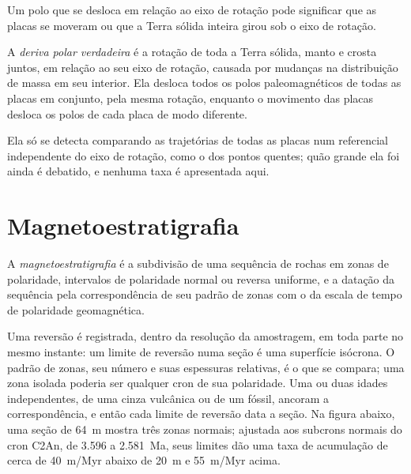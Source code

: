 Um polo que se desloca em relação ao eixo de rotação pode significar que as placas
se moveram ou que a Terra sólida inteira girou sob o eixo de rotação.

\begin{definition}\label{def:b3:palaeomagnetism:tpw}
A \emph{deriva polar verdadeira} é a rotação de toda a
Terra sólida, manto e crosta juntos, em relação ao seu eixo de rotação, causada
por mudanças na distribuição de massa em seu interior. Ela desloca todos os
polos paleomagnéticos de todas as placas em conjunto, pela mesma rotação, enquanto
o movimento das placas desloca os polos de cada placa de modo diferente.
\end{definition}

Ela só se detecta comparando as trajetórias de todas as placas num referencial
independente do eixo de rotação, como o dos pontos quentes; quão grande ela foi ainda é
debatido, e nenhuma taxa é apresentada aqui.

\section{Magnetoestratigrafia}

\begin{definition}[Magnetoestratigrafia]\label{def:b3:palaeomagnetism:magnetostratigraphy}
A \emph{magnetoestratigrafia} é a subdivisão de uma
sequência de rochas em zonas de polaridade, intervalos de polaridade normal ou reversa
uniforme, e a datação da sequência pela correspondência de seu padrão de zonas com
o da escala de tempo de polaridade geomagnética.
\end{definition}

Uma reversão é registrada, dentro da resolução da amostragem, em toda parte no
mesmo instante: um limite de reversão numa seção é uma superfície isócrona.
O padrão de zonas, seu número e suas espessuras relativas, é o que se compara;
uma zona isolada poderia ser qualquer cron de sua polaridade. Uma ou duas
idades independentes, de uma cinza vulcânica ou de um fóssil, ancoram a correspondência, e então
cada limite de reversão data a seção. Na figura abaixo, uma seção de
\qty{64}{m} mostra três zonas normais; ajustada aos subcrons normais do
cron C2An, de 3.596 a \qty{2.581}{Ma}, seus limites dão uma taxa de acumulação de
cerca de \qty{40}{m/Myr} abaixo de \qty{20}{m} e \qty{55}{m/Myr} acima.

